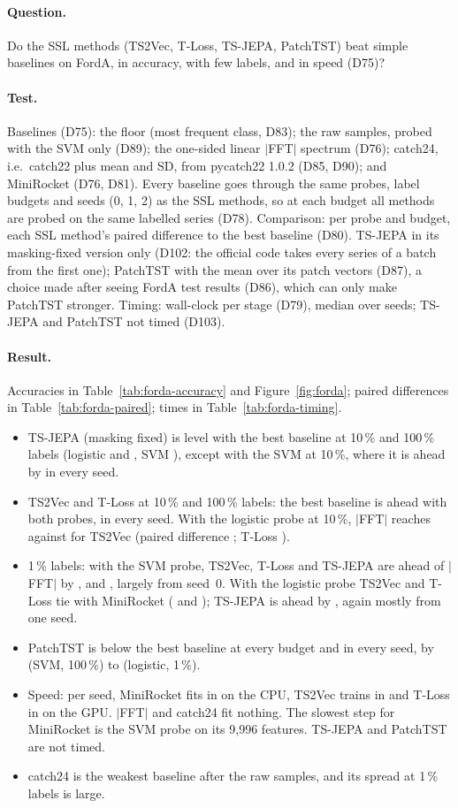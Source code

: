 \documentclass[11pt,a4paper]{article}
\newcommand{\question}{\paragraph{Question.}}
\newcommand{\test}{\paragraph{Test.}}
\newcommand{\result}{\paragraph{Result.}}
\begin{document}
\question
Do the SSL methods (TS2Vec, T-Loss, TS-JEPA, PatchTST) beat simple baselines on FordA, in
accuracy, with few labels, and in speed (D75)?

\test
Baselines (D75): the floor (most frequent class, D83); the raw samples, probed with the SVM
only (D89); the one-sided linear $|$FFT$|$ spectrum (D76); catch24, i.e.\ catch22 plus mean
and SD, from pycatch22 1.0.2 (D85, D90); and MiniRocket (D76, D81). Every baseline goes
through the same probes, label budgets and seeds (0, 1, 2) as the SSL methods, so at each
budget all methods are probed on the same labelled series (D78). Comparison: per probe and
budget, each SSL method's paired difference to the best baseline (D80). TS-JEPA in its
masking-fixed version only (D102: the official code takes every series of a batch from the
first one); PatchTST with the mean over its patch vectors (D87), a choice made after seeing
FordA test results (D86), which can only make PatchTST stronger. Timing: wall-clock per stage
(D79), median over seeds; TS-JEPA and PatchTST not timed (D103).

\result
Accuracies in Table~\ref{tab:forda-accuracy} and Figure~\ref{fig:forda}; paired differences
in Table~\ref{tab:forda-paired}; times in Table~\ref{tab:forda-timing}.
\begin{itemize}
  \item TS-JEPA (masking fixed) is level with the best baseline at 10\,\% and 100\,\% labels
        (logistic \FordaTsjepaDiffLogTen{} and \FordaTsjepaDiffLogHundred, SVM
        \FordaTsjepaDiffSvmHundred), except with the SVM at 10\,\%, where it is ahead by
        \FordaTsjepaDiffSvmTen{} in every seed.
  \item TS2Vec and T-Loss at 10\,\% and 100\,\% labels: the best baseline is ahead with both
        probes, in every seed. With the logistic probe at 10\,\%, $|$FFT$|$ reaches
        \FordaFftLogTen{} against \FordaTsvecLogTen{} for TS2Vec (paired difference
        \FordaTsvecDiffLogTen; T-Loss \FordaTlossDiffLogTen).
  \item 1\,\% labels: with the SVM probe, TS2Vec, T-Loss and TS-JEPA are ahead of $|$FFT$|$ by
        \FordaTsvecDiffSvmOne, \FordaTlossDiffSvmOne{} and \FordaTsjepaDiffSvmOne, largely
        from seed~0. With the logistic probe TS2Vec and T-Loss tie with MiniRocket
        (\FordaTsvecDiffLogOne{} and \FordaTlossDiffLogOne); TS-JEPA is ahead by
        \FordaTsjepaDiffLogOne, again mostly from one seed.
  \item PatchTST is below the best baseline at every budget and in every seed, by
        \FordaPatchtstDiffSvmHundred{} (SVM, 100\,\%) to \FordaPatchtstDiffLogOne{}
        (logistic, 1\,\%).
  \item Speed: per seed, MiniRocket fits in \FordaMinirocketFit{} on the CPU, TS2Vec trains in
        \FordaTsvecFit{} and T-Loss in \FordaTlossFit{} on the GPU. $|$FFT$|$ and catch24 fit
        nothing. The slowest step for MiniRocket is the SVM probe on its 9,996 features.
        TS-JEPA and PatchTST are not timed.
  \item catch24 is the weakest baseline after the raw samples, and its spread at 1\,\% labels
        is large.
\end{itemize}
\end{document}
